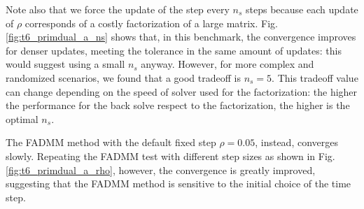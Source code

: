\documentclass[final,3p]{elsarticle}
\begin{document}
Note also that we force the update of the step every $n_s$ steps because each update of $\rho$ corresponds of a costly factorization of a large matrix.
Fig.\ref{fig:t6_primdual_a_ns} shows that, in this benchmark, the convergence improves for denser updates, 
meeting the tolerance in the same amount of updates: this would suggest using a small $n_s$ anyway. However, for more complex and randomized scenarios, 
we found that a good tradeoff is $n_s=5$. This tradeoff value can change depending on the speed of solver used for the factorization: the higher the performance
for the back solve respect to the factorization, the higher is the optimal $n_s$.

The FADMM method with the default fixed step $\rho=0.05$, instead, converges slowly. 
Repeating the FADMM test with different step sizes as shown in Fig.\ref{fig:t6_primdual_a_rho}, 
however, the convergence is greatly improved, suggesting that the FADMM method is sensitive to the initial choice of the time step. 
\end{document}
